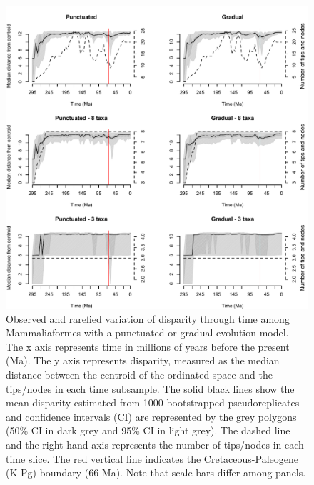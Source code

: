 \begin{figure}
\centering
    \includegraphics[keepaspectratio=true]{Supplementaries/Figures/STD/Slater_full.pdf}
\caption[Mammaliaformes disparity (rarefied)]{Observed and rarefied variation of disparity through time among Mammaliaformes with a punctuated or gradual evolution model. The x axis represents time in millions of years before the present (Ma). The y axis represents disparity, measured as the median distance between the centroid of the ordinated space and the tips/nodes in each time subsample. The solid black lines show the mean disparity estimated from 1000 bootstrapped pseudoreplicates and confidence intervals (CI) are represented by the grey polygons (50\% CI in dark grey and 95\% CI in light grey). The dashed line and the right hand axis represents the number of tips/nodes in each time slice. The red vertical line indicates the Cretaceous-Paleogene (K-Pg) boundary (66 Ma). Note that scale bars differ among panels.}
\label{Supp_Mammaliaformes_rarefied}
\end{figure}

